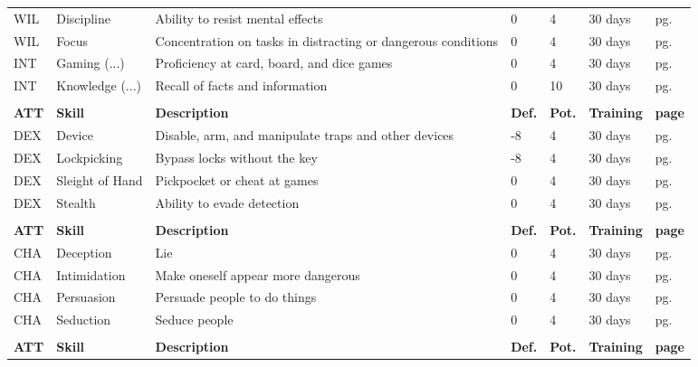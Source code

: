 \begin{center}
\begin{xltabular}{\textwidth}{l l X l l l l}
        WIL & Discipline & Ability to resist mental effects & 0 & 4 & 30 days & pg. \pageref{skill:self-control} \\
        WIL & Focus & Concentration on tasks in distracting or dangerous conditions & 0 & 4 & 30 days & pg. \pageref{skill:concentration} \\
        INT & Gaming (...) & Proficiency at card, board, and dice games & 0 & 4 & 30 days & pg. \pageref{skill:gaming} \\
        INT & Knowledge (...) & Recall of facts and information & 0 & 10 & 30 days & pg. \pageref{skill:knowledge} \\
         \\*
        \textbf{ATT} & \textbf{Skill} & \textbf{Description} & \textbf{Def.} & \textbf{Pot.} & \textbf{Training} & \textbf{page} \\*
        DEX & Device & Disable, arm, and manipulate traps and other devices & -8 & 4 & 30 days & pg. \pageref{skill:device} \\
        DEX & Lockpicking & Bypass locks without the key & -8 & 4 & 30 days & pg. \pageref{skill:lockpicking} \\
        DEX & Sleight of Hand & Pickpocket or cheat at games & 0 & 4 & 30 days & pg. \pageref{skill:sleight-of-hand} \\
        DEX & Stealth & Ability to evade detection & 0 & 4 & 30 days & pg. \pageref{skill:stealth} \\
         \\*
        \textbf{ATT} & \textbf{Skill} & \textbf{Description} & \textbf{Def.} & \textbf{Pot.} & \textbf{Training} & \textbf{page} \\*
        CHA & Deception & Lie & 0 & 4 & 30 days & pg. \pageref{skill:deception} \\
        CHA & Intimidation & Make oneself appear more dangerous & 0 & 4 & 30 days & pg. \pageref{skill:intimidation} \\
        CHA & Persuasion & Persuade people to do things & 0 & 4 & 30 days & pg. \pageref{skill:persuasion} \\
        CHA & Seduction & Seduce people & 0 & 4 & 30 days& pg. \pageref{skill:seduction} \\
         \\*
        \textbf{ATT} & \textbf{Skill} & \textbf{Description} & \textbf{Def.} & \textbf{Pot.} & \textbf{Training} & \textbf{page} \\*

\end{xltabular}
\end{center}
